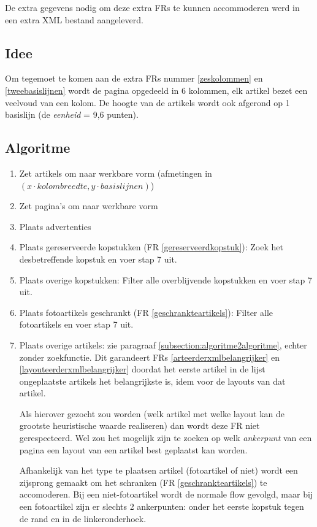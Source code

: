 \documentclass[a4paper,12pt]{report}
\begin{document}
De extra gegevens nodig om deze extra FRs te kunnen accommoderen werd in een extra XML bestand aangeleverd.

		\subsection{Idee}
Om tegemoet te komen aan de extra FRs nummer \ref{zeskolommen} en \ref{tweebasislijnen} wordt de pagina opgedeeld in 6 kolommen, elk artikel bezet een veelvoud van een kolom. De hoogte van de artikels wordt ook afgerond op 1 basislijn (de \textit{eenheid} = 9,6 punten).

		\subsection{Algoritme}
\begin{enumerate}
	\item Zet artikels om naar werkbare vorm (afmetingen in $(x \cdot kolombreedte, y \cdot basislijnen)$)
	\item Zet pagina's om naar werkbare vorm
	\item Plaats advertenties
	\item Plaats gereserveerde kopstukken (FR \ref{gereserveerdkopstuk}):
		\subitem Zoek het desbetreffende kopstuk en voer stap 7 uit.
	\item Plaats overige kopstukken:
		\subitem Filter alle overblijvende kopstukken en voer stap 7 uit.
	\item Plaats fotoartikels geschrankt (FR \ref{geschrankteartikels}):
		\subitem Filter alle fotoartikels en voer stap 7 uit.
	\item Plaats overige artikels: zie paragraaf \ref{subsection:algoritme2algoritme}, echter zonder zoekfunctie. Dit garandeert FRs \ref{arteerderxmlbelangrijker} en \ref{layouteerderxmlbelangrijker} doordat het eerste artikel in de lijst ongeplaatste artikels het belangrijkste is, idem voor de layouts van dat artikel. 
	
Als hierover gezocht zou worden (welk artikel met welke layout kan de grootste heuristische waarde realiseren) dan wordt deze FR niet gerespecteerd. Wel zou het mogelijk zijn te zoeken op welk \textit{ankerpunt} van een pagina een layout van een artikel best geplaatst kan worden.

Afhankelijk van het type te plaatsen artikel (fotoartikel of niet) wordt een zijsprong gemaakt om het schranken (FR \ref{geschrankteartikels}) te accomoderen. Bij een niet-fotoartikel wordt de normale flow gevolgd, maar bij een fotoartikel zijn er slechts 2 ankerpunten: onder het eerste kopstuk tegen de rand en in de linkeronderhoek.
\end{enumerate}
\end{document}
